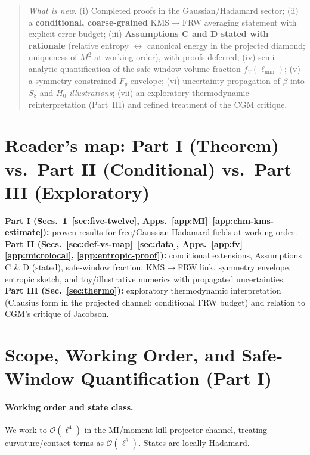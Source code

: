 \documentclass[aps,prd,onecolumn,superscriptaddress,nofootinbib]{revtex4-2}
\begin{document}
\begin{abstract}
\smallskip
\emph{What is new.} (i) Completed proofs in the Gaussian/Hadamard sector; (ii) a \textbf{conditional, coarse-grained} KMS\(\to\)FRW averaging statement with explicit error budget; (iii) \textbf{Assumptions C and D stated with rationale} (relative entropy \(\leftrightarrow\) canonical energy in the projected diamond; uniqueness of \(M^2\) at working order), with proofs deferred; (iv) semi-analytic quantification of the safe-window volume fraction \(f_V(\ell_{\min})\); (v) a symmetry-constrained \(F_g\) envelope; (vi) uncertainty propagation of \(\beta\) into \(S_8\) and \(H_0\) \emph{illustrations}; (vii) an exploratory thermodynamic reinterpretation (Part~III) and refined treatment of the CGM critique.
\end{abstract}

\maketitle

\section*{Reader’s map: Part I (Theorem) vs.\ Part II (Conditional) vs.\ Part III (Exploratory)}
\noindent \textbf{Part I (Secs.~\ref{sec:scope}–\ref{sec:five-twelve}, Apps.~\ref{app:MI}–\ref{app:chm-kms-estimate}):} proven results for free/Gaussian Hadamard fields at working order.\\
\textbf{Part II (Secs.~\ref{sec:def-vs-map}–\ref{sec:data}, Apps.~\ref{app:fv}–\ref{app:microlocal}, \ref{app:entropic-proof}):} conditional extensions, Assumptions C \& D (stated), safe-window fraction, KMS\(\to\)FRW link, symmetry envelope, entropic sketch, and toy/illustrative numerics with propagated uncertainties.\\
\textbf{Part III (Sec.~\ref{sec:thermo}):} exploratory thermodynamic interpretation (Clausius form in the projected channel; conditional FRW budget) and relation to CGM’s critique of Jacobson.

\section{Scope, Working Order, and Safe-Window Quantification (Part I)}
\label{sec:scope}

\paragraph{Working order and state class.} We work to \(\mathcal O(\ell^4)\) in the MI/moment-kill projector channel, treating curvature/contact terms as \(\mathcal O(\ell^6)\). States are locally Hadamard.
\end{document}
